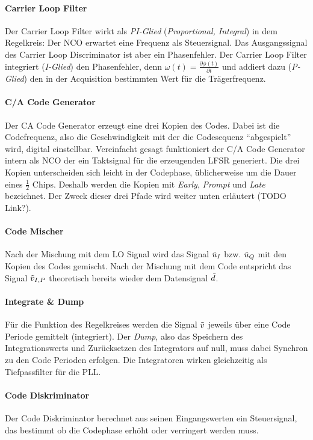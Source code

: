 \paragraph{Carrier Loop Filter} Der Carrier Loop Filter wirkt als \emph{PI-Glied} (\emph{Proportional, Integral}) in dem Regelkreis: Der NCO erwartet eine Frequenz als Steuersignal. Das Ausgangssignal des Carrier Loop Discriminator ist aber ein Phasenfehler. Der Carrier Loop Filter integriert (\emph{I-Glied}) den Phasenfehler, denn $\omega(t)=\frac{\partial \phi(t)}{\partial t}$ und addiert dazu (\emph{P-Glied}) den in der Acquisition bestimmten Wert für die Trägerfrequenz.

\paragraph{C/A Code Generator} Der \gls{CA} Code Generator erzeugt eine drei Kopien des Codes. Dabei ist die Codefrequenz, also die Geschwindigkeit mit der die Codesequenz \enquote{abgespielt} wird, digital einstellbar. Vereinfacht gesagt  funktioniert der C/A Code Generator intern als \gls{NCO} der ein Taktsignal für die erzeugenden \gls{LFSR} generiert. Die drei Kopien unterscheiden sich leicht in der Codephase, üblicherweise um die Dauer eines $\frac{1}{2}$ Chips. Deshalb werden die Kopien mit \emph{Early}, \emph{Prompt} und \emph{Late} bezeichnet. Der Zweck dieser drei Pfade wird weiter unten erläutert (TODO Link?).

\paragraph{Code Mischer} Nach der Mischung mit dem LO Signal wird das Signal $\tilde{u}_I$ bzw. $\tilde{u}_Q$ mit den Kopien des Codes gemischt. Nach der Mischung mit dem Code entspricht das Signal $\tilde{v}_{I,P}$ theoretisch bereits wieder dem Datensignal $\tilde{d}$.

\paragraph{Integrate \& Dump} Für die Funktion des Regelkreises werden die Signal $\tilde{v}$ jeweils über eine Code Periode gemittelt (integriert). Der \emph{Dump}, also das Speichern des Integrationswerts und Zurücksetzen des Integrators auf null, muss dabei Synchron zu den Code Perioden erfolgen. Die Integratoren wirken gleichzeitig als Tiefpassfilter für die PLL.

\paragraph{Code Diskriminator} Der Code Diskriminator berechnet aus seinen Eingangswerten ein Steuersignal, das bestimmt ob die Codephase erhöht oder verringert werden muss.

